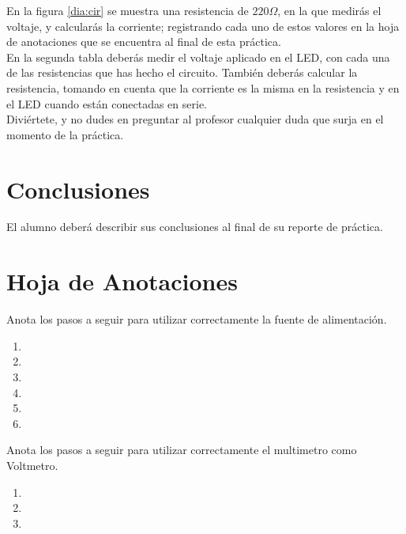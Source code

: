     En la figura \ref{dia:cir} se muestra una resistencia de $220 \Omega$, en la que medirás el voltaje, y calcularás la corriente; registrando cada uno de estos valores en la hoja de anotaciones que se encuentra al final de esta práctica. \\

    En la segunda tabla deberás medir el voltaje aplicado en el LED, con cada una de las resistencias que has hecho el circuito. También deberás calcular la resistencia, tomando en cuenta que la corriente es la misma en la resistencia y en el LED cuando están conectadas en serie. \\

    Diviértete, y no dudes en preguntar al profesor cualquier duda que surja en el momento de la práctica. \\


\section{Conclusiones}
	El alumno deberá describir sus conclusiones al final de su reporte de práctica.
    

\clearpage
\section{Hoja de Anotaciones}
	Anota los pasos a seguir para utilizar correctamente la fuente de alimentación.

	\begin{enumerate}
		\item
		\item
		\item
		\item
		\item
		\item
	\end{enumerate}

	Anota los pasos a seguir para utilizar correctamente el multimetro como Voltmetro.

	\begin{enumerate}
		\item
		\item
		\item
	\end{enumerate}


